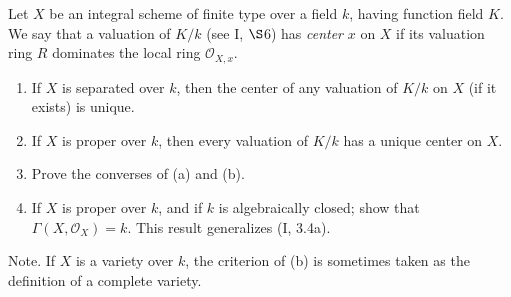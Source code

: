 \begin{exercise}
	Let $X$ be an integral scheme of finite type over a field $k$, having function field $K$. We say that a valuation of $K/k$ (see I, $\S $6) has \textit{center} $x$ on $X$ if its valuation ring $R$ dominates the local ring $\mathcal{O}_{X,x} $.
	\begin{enumerate}
		\item If $X$ is separated over $k$, then the center of any valuation of $K/k$ on $X$ (if it exists) is unique. 
		\item If $X$ is proper over $k $, then every valuation of $K/k$ has a unique center on $X$. 
		\item Prove the converses of (a) and (b). 
			\fi
		\item If $X$ is proper over $k$, and if $k$ is algebraically closed; show that $\Gamma(X,\mathcal{O}_X) = k $. This result generalizes (I, 3.4a). 
			\fi
\end{enumerate}
Note. If $X$ is a variety over $k$, the criterion of (b) is sometimes taken as the definition of a complete variety. 
\end{exercise}
